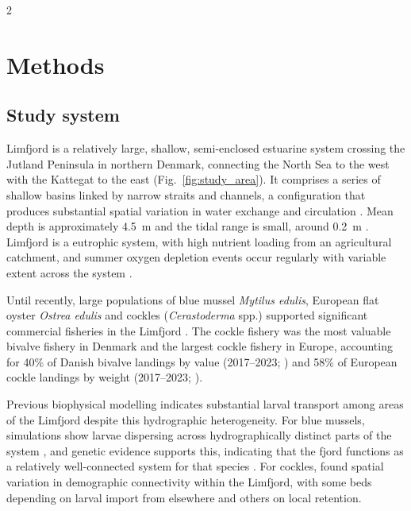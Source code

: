 \begin{spacing}{2}
\section{Methods}

\subsection{Study system}

Limfjord is a relatively large, shallow, semi-enclosed estuarine system crossing the Jutland Peninsula in northern Denmark, connecting the North Sea to the west with the Kattegat to the east (Fig.~\ref{fig:study_area}). It comprises a series of shallow basins linked by narrow straits and channels, a configuration that produces substantial spatial variation in water exchange and circulation \citep{hofmeisterThreedimensionalModelStudy2009}. Mean depth is approximately 4.5~m and the tidal range is small, around 0.2~m \citep{wilesStratificationMixingLimfjorden2006, dolmerEvaluationDanishMussel2002}. Limfjord is a eutrophic system, with high nutrient loading from an agricultural catchment, and summer oxygen depletion events occur regularly with variable extent across the system \citep{schourup-kristensenDriversHypoxiaVariability2023}. 

Until recently, large populations of blue mussel \textit{Mytilus edulis}, European flat oyster \textit{Ostrea edulis} and cockles (\textit{Cerastoderma} spp.) supported significant commercial fisheries in the Limfjord \citep[e.g.][]{nielsenFlatOysterFishery2019, nielsenManagementBivalveFisheries2021,
Freitas2024}. The cockle fishery was the most valuable bivalve
fishery in Denmark and the largest cockle fishery in Europe, accounting for 40\% of Danish bivalve landings by value (2017--2023; \citealp{fiskeristyrelsen2026}) and 58\% of European cockle landings by weight (2017--2023; \citealp{eurostat2026}).

Previous biophysical modelling indicates substantial larval transport among areas of the Limfjord despite this hydrographic heterogeneity. For blue mussels, simulations show larvae dispersing across hydrographically distinct parts of the system \citep{pastorAgentbasedModelingGenetics2021, pastorSensitivityAnalysisMussel2023}, and genetic evidence supports this, indicating that the fjord functions as a relatively well-connected system for that species \citep{pastorAgentbasedModelingGenetics2021}. For cockles, \citet{hansenAssessingDemographicConnectivity2024} found spatial variation in demographic connectivity within the Limfjord, with some beds depending on larval import from elsewhere and others on local retention.


\end{spacing}

